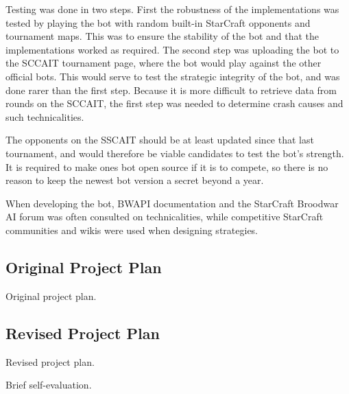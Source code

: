 Testing was done in two steps. First the robustness of the implementations was tested by playing the bot with random built-in StarCraft opponents and tournament maps. This was to ensure the stability of the bot and that the implementations worked as required. The second step was uploading the bot to the SCCAIT tournament page, where the bot would play against the other official bots. This would serve to test the strategic integrity of the bot, and was done rarer than the first step. Because it is more difficult to retrieve data from rounds on the SCCAIT, the first step was needed to determine crash causes and such technicalities.

The opponents on the SSCAIT should be at least updated since that last tournament, and would therefore be viable candidates to test the bot's strength. It is required to make ones bot open source if it is to compete, so there is no reason to keep the newest bot version a secret beyond a year.

When developing the bot, BWAPI documentation and the StarCraft Broodwar AI forum was often consulted on technicalities, while competitive StarCraft communities and wikis were used when designing strategies.

	\subsection{Original Project Plan}
	Original project plan.
	
	\subsection{Revised Project Plan}
	Revised project plan.

Brief self-evaluation.

